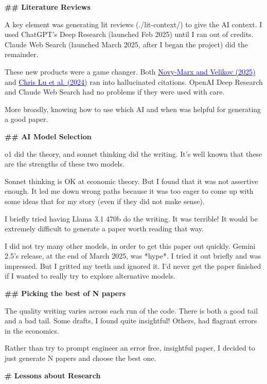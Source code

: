 \begin{mdframed}[linewidth=1pt, linecolor=black]
\textbf{\textcolor{red!70!black}{\#\# Literature Reviews}}

A key element was generating lit reviews (\colorbox{gray!10}{\textcolor{red!70!black}{./lit-context/}}) to give the AI context. I used ChatGPT's Deep Research (launched Feb 2025) until I ran out of credits. Claude Web Search (launched March 2025, after I began the project) did the remainder.

These new products were a game changer. Both \href{https://www.nber.org/papers/w33363}{\textcolor{blue}{Novy-Marx and Velikov (2025)}}  and \href{https://arxiv.org/abs/2408.06292}{\textcolor{blue}{Chris Lu et al. (2024)}} ran into hallucinated citations. OpenAI Deep Research and Claude Web Search had no problems if they were used with care. 

More broadly, knowing how to use which AI and when was helpful for generating a good paper. 

\textbf{\textcolor{red!70!black}{\#\# AI Model Selection }}

o1 did the theory, and sonnet thinking did the writing. It's well known that these are the strengths of these two models. 

Sonnet thinking is OK at economic theory. But I found that it was not assertive enough. It led me down wrong paths because it was too eager to come up with some ideas that for my story (even if they did not make sense).  

I briefly tried having Llama 3.1 470b do the writing. It was terrible! It would be extremely difficult to generate a paper worth reading that way. 

I did not try many other models, in order to get this paper out quickly. Gemini 2.5's release, at the end of March 2025, was *hype*. I tried it out briefly and was impressed. But I gritted my teeth and ignored it. I'd never get the paper finished if I wanted to really try to explore alternative models. 

\textbf{\textcolor{red!70!black}{\#\# Picking the best of N papers}}

The quality writing varies across each run of the code. There is both a good tail and a bad tail. Some drafts, I found quite insightful! Others, had flagrant errors in the economics. 

Rather than try to prompt engineer an error free, insightful paper, I decided to just generate N papers and choose the best one. 

\textbf{\textcolor{red!70!black}{\# Lessons about Research }}


\end{mdframed}
